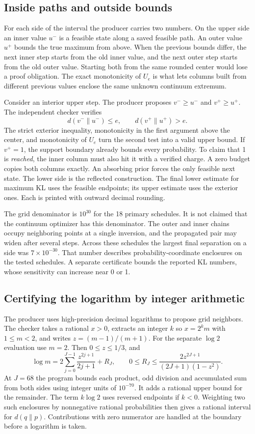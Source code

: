 \documentclass[12pt,letterpaper]{article}
\begin{document}
\subsection{Inside paths and outside bounds}
For each side of the interval the producer carries two numbers. On the upper side an inner value \(u^-\) is a feasible state along a saved feasible path. An outer value \(u^+\) bounds the true maximum from above. When the previous bounds differ, the next inner step starts from the old inner value, and the next outer step starts from the old outer value. Starting both from the same rounded center would lose a proof obligation. The exact monotonicity of \(U_e\) is what lets columns built from different previous values enclose the same unknown continuum extremum.

Consider an interior upper step. The producer proposes \(v^-\ge u^-\) and \(v^+\ge u^+\). The independent checker verifies
\[
        d(v^-\|u^-)\le e,\qquad d(v^+\|u^+)>e .
\]
The strict exterior inequality, monotonicity in the first argument above the center, and monotonicity of \(U_e\) turn the second test into a valid upper bound. If \(v^+=1\), the support boundary already bounds every probability. To claim that 1 is \emph{reached}, the inner column must also hit it with a verified charge. A zero budget copies both columns exactly. An absorbing prior forces the only feasible next state. The lower side is the reflected construction. The final lower estimate for maximum KL uses the feasible endpoints; its upper estimate uses the exterior ones. Each is printed with outward decimal rounding.

The grid denominator is \(10^{30}\) for the 18 primary schedules. It is not claimed that the continuum optimizer has this denominator. The outer and inner chains occupy neighboring points at a single inversion, and the propagated pair may widen after several steps. Across these schedules the largest final separation on a side was \(7\times10^{-30}\). That number describes probability-coordinate enclosures on the tested schedules. A separate certificate bounds the reported KL numbers, whose sensitivity can increase near 0 or 1.

\subsection{Certifying the logarithm by integer arithmetic}
The producer uses high-precision decimal logarithms to propose grid neighbors. The checker takes a rational \(x>0\), extracts an integer \(k\) so \(x=2^k m\) with \(1\le m<2\), and writes \(z=(m-1)/(m+1)\). For the separate \(\log2\) evaluation use \(m=2\). Then \(0\le z\le1/3\), and
\[
 \log m=2\sum_{j=0}^{J-1}\frac{z^{2j+1}}{2j+1}+R_J,\qquad
 0\le R_J\le\frac{2z^{2J+1}}{(2J+1)(1-z^2)} .
\]
At \(J=68\) the program bounds each product, odd division and accumulated sum from both sides using integer units of \(10^{-70}\). It adds a rational upper bound for the remainder. The term \(k\log 2\) uses reversed endpoints if \(k<0\). Weighting two such enclosures by nonnegative rational probabilities then gives a rational interval for \(d(q\|p)\). Contributions with zero numerator are handled at the boundary before a logarithm is taken.
\end{document}
